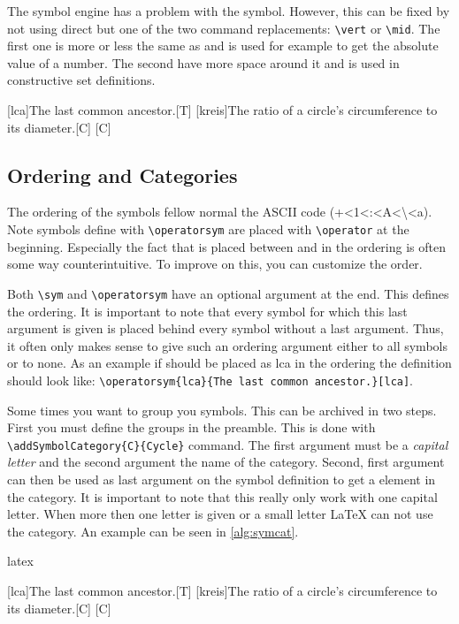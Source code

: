 The symbol engine has a problem with the \quo{$\vert$} symbol. However, this
can be fixed by not using direct \quo{$|$} but one of the two command
replacements: \verb|\vert| or \verb|\mid|. The first one is more or less the
same as \quo{$|$} and is used for example to get the absolute value of a number.
The second have more space around it and is used in constructive set
definitions.

[lca]{The last common ancestor.}[T]
\sym{\pi}[kreis]{The ratio of a circle's circumference to its diameter.}[C]
[C]

\subsection{Ordering and Categories}
The ordering of the symbols fellow normal the ASCII code
(+<1<:<A<\textbackslash<a). Note symbols define with \verb!\operatorsym! are
placed with \verb!\operator! at the beginning. Especially the fact that
\quo{\textbackslash} is placed between  and  in the ordering is
often some way counterintuitive. To improve on this, you can customize the
order.

Both \verb!\sym! and \verb!\operatorsym! have an optional argument at the
end. This defines the ordering. It is important to note that every symbol for
which this last argument is given is placed behind every symbol without a last
argument.  Thus, it often only makes sense to give such an ordering argument
either to all symbols or to none. As an example if \quo{\symlca} should be
placed as lca in the ordering the definition should look like:
\verb!\operatorsym{lca}{The last common ancestor.}[lca]!.

Some times you want to group you symbols. This can be archived in two steps.
First you must define the groups in the preamble. This is done with
\verb!\addSymbolCategory{C}{Cycle}! command. The first argument must be a
\emph{capital letter} and the second argument the name of the category.
Second, first argument can then be used as last argument on the symbol
definition to get a element in the category. It is important to note that this
really only work with one capital letter. When more then one letter is given or
a small letter \LaTeX{} can not use the category. An example can be seen in
\autoref{alg:symcat}.

\begin{algorithm}
    \label{alg:symcat}
\begin{code}{latex}


[lca]{The last common ancestor.}[T]
\sym{\pi}[kreis]{The ratio of a circle's
    circumference to its diameter.}[C]
[C]


\end{code}
\end{algorithm}

